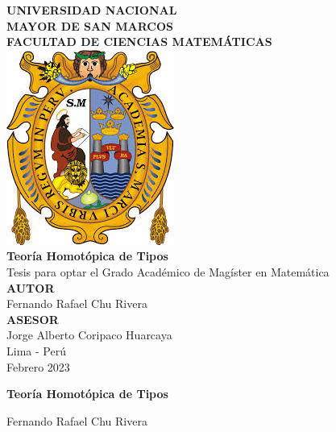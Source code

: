 \documentclass[12pt]{report}
\theoremstyle{definition}
\theoremstyle{plain}
\begin{document}
\begin{titlepage}
    \setlength{\parindent}{0pt} \setlength{\parskip}{0pt}
    \begin{center}
        \textsc{\large \textbf{UNIVERSIDAD NACIONAL \\MAYOR DE SAN MARCOS}}\\[0.4cm]
        {\large \textbf{FACULTAD DE CIENCIAS MATEM\'ATICAS}}\\[2cm]

        \includegraphics[scale = 0.5]{images/shield}\\[1 cm]

        {\Large \bfseries Teoría Homot\'opica de Tipos}\\[1cm]

        Tesis para optar el Grado Acad\'emico de Mag\'ister en Matem\'atica \\[1.8 cm]

        \textbf{AUTOR}\\[0.2cm]
        Fernando Rafael Chu Rivera \\[1cm]
        \textbf{ASESOR}\\[0.2cm]
        Jorge Alberto Coripaco Huarcaya \\[2.5cm]

        Lima - Per\'u \\
        Febrero 2023
    \end{center}
\end{titlepage}

\newpage
{}
\pagestyle{plain}
\begin{center}
    \textbf{Teoría Homot\'opica de Tipos} \\[1.5cm]
\end{center}

\begin{center}
    Fernando Rafael Chu Rivera \\[1.5cm]
\end{center}
\end{document}
